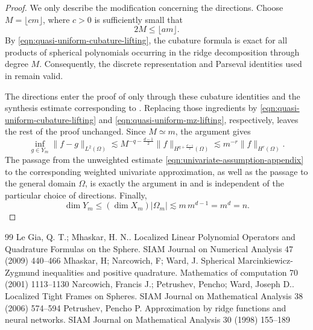 \documentclass[10pt,a4paper]{amsart}
\numberwithin{equation}{section}
\begin{document}
\begin{proof}
We only describe the modification concerning the directions. Choose $M=\lfloor cm\rfloor$, where $c>0$ is sufficiently small that
$$
2M\leq\lfloor am\rfloor.
$$
By \eqref{eqn:quasi-uniform-cubature-lifting}, the cubature formula is exact for all products of spherical polynomials occurring in the ridge decomposition through degree $M$. Consequently, the discrete representation and Parseval identities used in \cite[(4.22)--(4.23)]{petrushev1998approximation} remain valid.

The directions enter the proof of \cite[Theorem~7.1]{petrushev1998approximation} only through these cubature identities and the synthesis estimate corresponding to \cite[Lemmas~4.2--4.4]{petrushev1998approximation}. Replacing those ingredients by \eqref{eqn:quasi-uniform-cubature-lifting} and \eqref{eqn:quasi-uniform-mz-lifting}, respectively, leaves the rest of the proof unchanged. Since $M\simeq m$, the argument gives
$$
\inf_{g\in Y_m}\|f-g\|_{L^2(\Omega)}
\lesssim
M^{-q-\frac{d-1}{2}}
\|f\|_{H^{q+\frac{d-1}{2}}(\Omega)}
\lesssim
m^{-r}\|f\|_{H^r(\Omega)}.
$$
The passage from the unweighted estimate \eqref{eqn:univariate-assumption-appendix} to the corresponding weighted univariate approximation, as well as the passage to the general domain $\Omega$, is exactly the argument in \cite[Section~8 and Theorem~8.2]{petrushev1998approximation} and is independent of the particular choice of directions. Finally,
$$
\dim Y_m
\leq
(\dim X_m)|\Omega_m|
\lesssim
m\,m^{d-1}
=
m^d=n.
$$
\end{proof}


\begin{thebibliography}{99}
 Le Gia, Q. T.; Mhaskar, H. N.. Localized Linear Polynomial Operators and Quadrature Formulas on the Sphere. SIAM Journal on Numerical Analysis 47 (2009) 440--466
 Mhaskar, H; Narcowich, F; Ward, J. Spherical Marcinkiewicz-Zygmund inequalities and positive quadrature. Mathematics of computation 70 (2001) 1113--1130
 Narcowich, Francis J.; Petrushev, Pencho; Ward, Joseph D.. Localized Tight Frames on Spheres. SIAM Journal on Mathematical Analysis 38 (2006) 574--594
 Petrushev, Pencho P. Approximation by ridge functions and neural networks. SIAM Journal on Mathematical Analysis 30 (1998) 155--189
\end{thebibliography}
\end{document}
